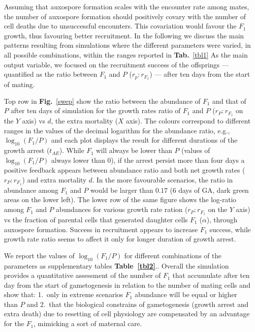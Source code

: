 \documentclass[a4paper,oneside]{article}
\begin{document}
    Assuming that auxospore formation scales with the encounter rate among mates, the number of auxospore formation should positively covary with the number of cell deaths due to unsuccessful encounters.
    This covariation would favour the $F_{1}$ growth, thus favouring better recruitment.
    In the following we discuss the main patterns resulting from simulations where the different parameters were varied, in all possible combinations, within the ranges reported in \textbf{Tab.}~\ref{tbl1}
    As the main output variable, we focused on the recruitment success of the offsprings --- quantified as the ratio between $F_{1}$ and $P$ ($r_p : r_{F_{1}}$) --- after ten days from the start of mating.

    Top row in \textbf{Fig.}~\ref{swep} show the ratio between the abundance of $F_{1}$ and that of $P$ after ten days of simulation for the growth rates ratio of $F_{1}$ and $P$ ($r_P : r_{F_{1}}$ on the $Y$ axis) vs $d$, the extra mortality ($X$ axis).
    The colours correspond to different ranges in the values of the decimal logarithm for the abundance ratio, e.g., $\log_{10}(F_{1}/P)$ and each plot displays the result for different durations of the growth arrest ($t_{AE}$).
    While $F_{1}$ will always be lower than $P$ (values of $\log_{10}(F_{1}/P)$ always lower than $0$), if the arrest persist more than four days a positive feedback appears between  abundance ratio and both net growth rates ($r_P : r_{F_{1}}$) and extra mortality $d$.
    In the more favourable scenarios, the ratio in abundance among $F_{1}$ and $P$ would be larger than $0.17$ (6 days of GA, dark green areas on the lower left).
    The lower row of the same figure shows the log-ratio among $F_{1}$ and $P$ abundances for various growth rate ration ($r_P : r_{F_{1}}$ on the $Y$ axis) vs the fraction of parental cells that generated daughter cells $F_{1}$ ($\alpha$), through auxospore formation.
    Success in recruitment appears to increase $F_{1}$ success, while growth rate ratio seems to affect it only for longer duration of growth arrest.

    We report the values of $\log_{10}(F_{1}/P)$ for different combinations of the parameters as supplementary tables \textbf{Table~\ref{tbl2}}..
    Overall the simulation provides a quantitative assessment of the number of $F_{1}$ that accumulate after ten day from the start of gametogenesis in relation to the number of mating cells and show that:
    1.\ only in extreme scenarios $F_{1}$ abundance will be equal or higher than $P$ and
    2.\ that the biological constrains of gametogenesis (growth arrest and extra death) due to resetting of cell physiology are compensated by an advantage for the $F_{1}$, mimicking a sort of maternal care.
\end{document}
